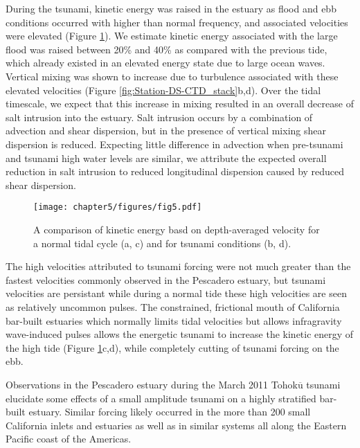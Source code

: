 During the tsunami, kinetic energy was raised in the estuary as flood
and ebb conditions occurred with higher than normal frequency, and
associated velocities were elevated (Figure \ref{fig:kinetic_energy}).
We estimate kinetic energy associated with the large flood was raised
between 20\% and 40\% as compared with the previous tide, which already
existed in an elevated energy state due to large ocean waves. Vertical
mixing was shown to increase due to turbulence associated with these
elevated velocities (Figure \ref{fig:Station-DS-CTD_stack}b,d). Over
the tidal timescale, we expect that this increase in mixing resulted
in an overall decrease of salt intrusion into the estuary. Salt intrusion
occurs by a combination of advection and shear dispersion, but in
the presence of vertical mixing shear dispersion is reduced. Expecting
little difference in advection when pre-tsunami and tsunami high water
levels are similar, we attribute the expected overall reduction in
salt intrusion to reduced longitudinal dispersion caused by reduced
shear dispersion. 

\begin{figure}
\centering
\texttt{[image: chapter5/figures/fig5.pdf]}

\protect\caption{A comparison of kinetic energy basd on depth-averaged velocity for
a normal tidal cycle (a, c) and for tsunami conditions (b, d). \label{fig:kinetic_energy}}
\end{figure}


The high velocities attributed to tsunami forcing were not much greater
than the fastest velocities commonly observed in the Pescadero estuary,
but tsunami velocities are persistant while during a normal tide these
high velocities are seen as relatively uncommon pulses. The constrained,
frictional mouth of California bar-built estuaries which normally
limits tidal velocities but allows infragravity wave-induced pulses
allows the energetic tsunami to increase the kinetic energy of the
high tide (Figure \ref{fig:kinetic_energy}c,d), while completely
cutting of tsunami forcing on the ebb. 

Observations in the Pescadero estuary during the March 2011 Tohok$\overline{\mathrm{u}}$
tsunami elucidate some effects of a small amplitude tsunami on a highly
stratified bar-built estuary. Similar forcing likely occurred in the
more than 200 small California inlets and estuaries as well as in similar
systems all along the Eastern Pacific coast of the Americas. 





